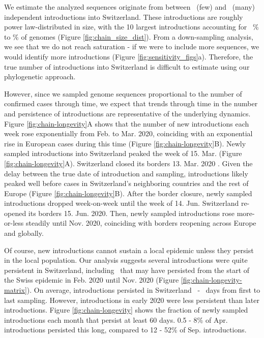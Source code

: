\documentclass[11pt,twoside,lineno]{pnas-new} %
\begin{document}
We estimate the analyzed sequences originate from between \nchainsmin\ (few) and \nchainsmax\ (many) independent introductions into Switzerland. These introductions are roughly power law-distributed in size, with the 10 largest introductions accounting for \maxlargestchainsper\ \% to \minlargestchainsper \% of genomes (Figure \ref{fig:chain_size_dist}). From a down-sampling analysis, we see that we do not reach saturation - if we were to include more sequences, we would identify more introductions (Figure \ref{fig:sensitivity_figs}a). Therefore, the true number of introductions into Switzerland is difficult to estimate using our phylogenetic approach. 

However, since we sampled genome sequences proportional to the number of confirmed cases through time, we expect that trends through time in the number and persistence of introductions are representative of the underlying dynamics. Figure \ref{fig:chain-longevity}A shows that the number of new introductions each week rose exponentially from Feb. to Mar. 2020, coinciding with an exponential rise in European cases during this time (Figure \ref{fig:chain-longevity}B). Newly sampled introductions into Switzerland peaked the week of 15. Mar. (Figure \ref{fig:chain-longevity}A). Switzerland closed its borders 13. Mar. 2020 \cite{SWI-border-closure}. Given the delay between the true date of introduction and sampling, introductions likely peaked well before cases in Switzerland's neighboring countries and the rest of Europe (Figure \ref{fig:chain-longevity}B). After the border closure, newly sampled introductions dropped week-on-week until the week of 14. Jun. Switzerland re-opened its borders 15. Jun. 2020. Then, newly sampled introductions rose more-or-less steadily until Nov. 2020, coinciding with borders reopening across Europe and globally. 

Of course, new introductions cannot sustain a local epidemic unless they persist in the local population. Our analysis suggests several introductions were quite persistent in Switzerland, including \nspanningchainsfebnovmin\ that may have persisted from the start of the Swiss epidemic in Feb. 2020 until Nov. 2020 (Figure \ref{fig:chain-longevity-matrix}). On average, introductions persisted in Switzerland \meantimetolastsamplemax\ - \meantimetolastsamplemin\ days from first to last sampling. However, introductions in early 2020 were less persistent than later introductions. Figure \ref{fig:chain-longevity} shows the fraction of newly sampled introductions each month that persist at least 60 days. 0.5 - 8\% of Apr. introductions persisted this long, compared to 12 - 52\% of Sep. introductions. 
\end{document}
